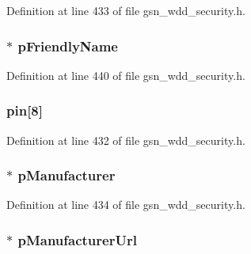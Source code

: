 Definition at line 433 of file gsn\_\-wdd\_\-security.h.

\hypertarget{a00296_a4e03d5ecd56303e62d97a9d17fecbef3}{
\subsubsection[{pFriendlyName}]{$\ast$ {\bf pFriendlyName}}}
\label{a00296_a4e03d5ecd56303e62d97a9d17fecbef3}


Definition at line 440 of file gsn\_\-wdd\_\-security.h.

\hypertarget{a00296_ad4be93120a175f6630af23503a0a8c3c}{
\subsubsection[{pin}]{ {\bf pin}\mbox{[}8\mbox{]}}}
\label{a00296_ad4be93120a175f6630af23503a0a8c3c}


Definition at line 432 of file gsn\_\-wdd\_\-security.h.

\hypertarget{a00296_ac4d49e4679a63d847dcfbf72a54c43cf}{
\subsubsection[{pManufacturer}]{$\ast$ {\bf pManufacturer}}}
\label{a00296_ac4d49e4679a63d847dcfbf72a54c43cf}


Definition at line 434 of file gsn\_\-wdd\_\-security.h.

\hypertarget{a00296_ad8596c9cecbf3e023608c67be2595c94}{
\subsubsection[{pManufacturerUrl}]{$\ast$ {\bf pManufacturerUrl}}}
\label{a00296_ad8596c9cecbf3e023608c67be2595c94}


